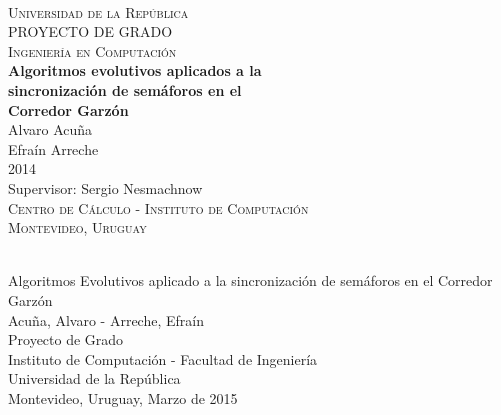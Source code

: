 \begin{titlepage}
  \thispagestyle{empty}
  \begin{center}
    ~\\[2.2cm]



    \textsc{\Huge Universidad de la República } \\[2.5cm]
    \textsc{\Huge PROYECTO DE GRADO } \\[0.5cm]
    \textsc{\Huge Ingeniería en Computación } \\[2.5cm]    
    \textbf{\Huge Algoritmos evolutivos aplicados a la } \\[0.2cm]
    \textbf{\Huge sincronización de semáforos en el } \\[0.3cm]
    \textbf{\Huge Corredor Garzón } \\[1.5cm]    
    
    {\huge Alvaro Acuña} \\[0.2cm]
    {\huge Efraín Arreche} \\[0.2cm]
    {\Large 2014} \\[2.0cm]
    {\Large Supervisor: Sergio Nesmachnow} \\[1.0cm]

    \textsc{\large Centro de Cálculo - Instituto de Computación} \\[0.2cm]
    \textsc{\large Montevideo, Uruguay} \\[1.5cm]

  \end{center}
  \vfill
\end{titlepage}
{
  \thispagestyle{empty}
  ~\\[16cm]
  Algoritmos Evolutivos aplicado a la sincronización de semáforos en el Corredor Garzón \\[0.05cm]
  Acuña, Alvaro - Arreche, Efraín \\[0.05cm]
  Proyecto de Grado \\[0.05cm]
  Instituto de Computación - Facultad de Ingeniería \\[0.05cm]
  Universidad de la República \\[0.05cm]
  Montevideo, Uruguay, Marzo de 2015 \\[0.05cm]
  \vfill
  \cleardoublepage
}
\setcounter{page}{1}